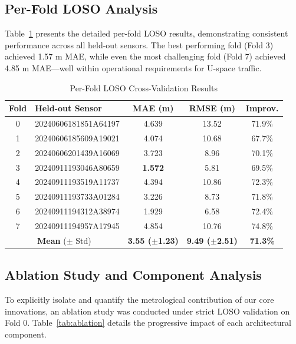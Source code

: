 \subsection{Per-Fold LOSO Analysis}

Table~\ref{tab:per_fold} presents the detailed per-fold LOSO results, demonstrating consistent performance across all held-out sensors. The best performing fold (Fold 3) achieved 1.57 m MAE, while even the most challenging fold (Fold 7) achieved 4.85 m MAE---well within operational requirements for U-space traffic.

\begin{table}[htbp]
\caption{Per-Fold LOSO Cross-Validation Results}
\label{tab:per_fold}
\centering
\begin{tabular}{clccc}
\toprule
\textbf{Fold} & \textbf{Held-out Sensor} & \textbf{MAE (m)} & \textbf{RMSE (m)} & \textbf{Improv.} \\
\midrule
0 & 20240606181851A64197 & 4.639 & 13.52 & 71.9\% \\
1 & 20240606185609A19021 & 4.074 & 10.68 & 67.7\% \\
2 & 20240606201439A16069 & 3.723 & 8.96 & 70.1\% \\
3 & 20240911193046A80659 & \textbf{1.572} & 5.81 & 69.5\% \\
4 & 20240911193519A11737 & 4.394 & 10.86 & 72.3\% \\
5 & 20240911193733A01284 & 3.226 & 8.73 & 71.8\% \\
6 & 20240911194312A38974 & 1.929 & 6.58 & 72.4\% \\
7 & 20240911194957A17945 & 4.854 & 10.76 & 74.8\% \\
\midrule
\multicolumn{2}{c}{\textbf{Mean} ($\pm$ Std)} & \textbf{3.55 ($\pm$1.23)} & \textbf{9.49 ($\pm$2.51)} & \textbf{71.3\%} \\
\bottomrule
\end{tabular}
\end{table}

\subsection{Ablation Study and Component Analysis}
\label{subsec:ablation}

To explicitly isolate and quantify the metrological contribution of our core innovations, an ablation study was conducted under strict LOSO validation on Fold 0. Table~\ref{tab:ablation} details the progressive impact of each architectural component.


